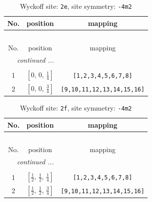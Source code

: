 \documentclass[fleqn,8pt]{jsarticle}
\begin{document}
\begin{longtable}{ccc}
\caption{Wyckoff site: {\tt 2e}, site symmetry: {\tt -4m2}}
 \\
 \hline \hline
No. & position & mapping \\ \hline \endfirsthead

\multicolumn{2}{l}{\tablename\ \thetable{}} \\
 \hline \hline
No. & position & mapping \\ \hline \endhead

 \hline \hline
\multicolumn{2}{r}{\footnotesize\it continued ...} \\ \endfoot

 \hline \hline
\multicolumn{2}{r}{} \\ \endlastfoot

1 & $\left[ 0,\, 0,\, \frac{1}{4} \right]$ & {\tt [1,2,3,4,5,6,7,8]} \\ \hline
2 & $\left[ 0,\, 0,\, \frac{3}{4} \right]$ & {\tt [9,10,11,12,13,14,15,16]} \\
\end{longtable}
\renewcommand{\arraystretch}{1.2}
\begin{longtable}{ccc}
\caption{Wyckoff site: {\tt 2f}, site symmetry: {\tt -4m2}}
 \\
 \hline \hline
No. & position & mapping \\ \hline \endfirsthead

\multicolumn{2}{l}{\tablename\ \thetable{}} \\
 \hline \hline
No. & position & mapping \\ \hline \endhead

 \hline \hline
\multicolumn{2}{r}{\footnotesize\it continued ...} \\ \endfoot

 \hline \hline
\multicolumn{2}{r}{} \\ \endlastfoot

1 & $\left[ \frac{1}{2},\, \frac{1}{2},\, \frac{1}{4} \right]$ & {\tt [1,2,3,4,5,6,7,8]} \\ \hline
2 & $\left[ \frac{1}{2},\, \frac{1}{2},\, \frac{3}{4} \right]$ & {\tt [9,10,11,12,13,14,15,16]} \\
\end{longtable}
\renewcommand{\arraystretch}{1.2}
\end{document}
